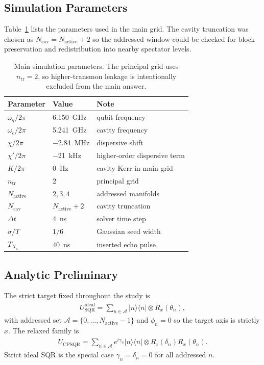 \documentclass[aps,pra,twocolumn,reprint,floatfix,amsmath,amssymb]{revtex4-2}
\begin{document}
\subsection{Simulation Parameters}
Table~\ref{tab:system_parameters} lists the parameters used in the main grid. The cavity truncation was chosen as $N_{\mathrm{cav}} = N_{\mathrm{active}} + 2$ so the addressed window could be checked for block preservation and redistribution into nearby spectator levels.

\begin{table}[t]
\centering
\caption{Main simulation parameters. The principal grid uses $n_{\mathrm{tr}}=2$, so higher-transmon leakage is intentionally excluded from the main answer.}
\label{tab:system_parameters}
\begin{tabular}{@{}lll@{}}
\toprule
Parameter & Value & Note \\
\midrule
$\omega_q/2\pi$ & \SI{6.150}{GHz} & qubit frequency \\
$\omega_c/2\pi$ & \SI{5.241}{GHz} & cavity frequency \\
$\chi/2\pi$ & \SI{-2.84}{MHz} & dispersive shift \\
$\chi'/2\pi$ & \SI{-21}{kHz} & higher-order dispersive term \\
$K/2\pi$ & \SI{0}{Hz} & cavity Kerr in main grid \\
$n_{\mathrm{tr}}$ & $2$ & principal grid \\
$N_{\mathrm{active}}$ & $2,3,4$ & addressed manifolds \\
$N_{\mathrm{cav}}$ & $N_{\mathrm{active}}+2$ & cavity truncation \\
$\Delta t$ & \SI{4}{ns} & solver time step \\
$\sigma/T$ & $1/6$ & Gaussian seed width \\
$T_{X_\pi}$ & \SI{40}{ns} & inserted echo pulse \\
\bottomrule
\end{tabular}
\end{table}

\subsection{Analytic Preliminary}
The strict target fixed throughout the study is
\begin{align}
U_{\mathrm{SQR}}^{\mathrm{ideal}}
=
\sum_{n\in\mathcal{A}} |n\rangle\langle n| \otimes R_x(\theta_n),
\label{eq:strict_target}
\end{align}
with addressed set $\mathcal{A}=\{0,\ldots,N_{\mathrm{active}}-1\}$ and $\phi_n=0$ so the target axis is strictly $\hat{x}$. The relaxed family is
\begin{align}
U_{\mathrm{CPSQR}}
=
\sum_{n\in\mathcal{A}} e^{i\gamma_n}|n\rangle\langle n| \otimes R_z(\delta_n)R_x(\theta_n).
\label{eq:cpsqr_target}
\end{align}
Strict ideal SQR is the special case $\gamma_n=\delta_n=0$ for all addressed $n$.
\end{document}
